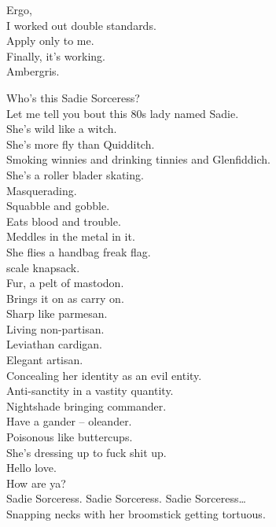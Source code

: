 Ergo, \\
I worked out double standards. \\
Apply only to me. \\
Finally, it's working. \\
Ambergris. \\




Who's this Sadie Sorceress? \\

Let me tell you bout this 80s lady named Sadie. \\
She's wild like a witch. \\
She's more fly than Quidditch. \\
Smoking winnies and drinking tinnies and Glenfiddich. \\
She's a roller blader skating. \\
Masquerading. \\
Squabble and gobble. \\
Eats blood and trouble. \\
Meddles in the metal in it. \\
She flies a handbag freak flag. \\
 scale knapsack. \\
Fur, a pelt of mastodon. \\
Brings it on as carry on. \\
Sharp like parmesan. \\
Living non-partisan. \\
Leviathan cardigan. \\
Elegant artisan. \\
Concealing her identity as an evil entity. \\
Anti-sanctity in a vastity quantity. \\
Nightshade bringing  commander. \\
Have a gander -- oleander. \\
Poisonous like buttercups. \\
She's dressing up to fuck shit up. \\

Hello love. \\
How are ya? \\

Sadie Sorceress. Sadie Sorceress. Sadie Sorceress… \\
Snapping necks with her broomstick getting tortuous. \\

